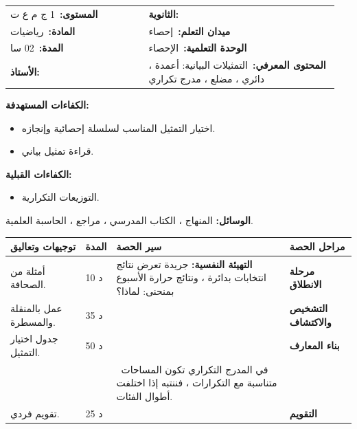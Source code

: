 \documentclass[12pt,a4paper]{article}
\makeatletter
\newenvironment{LTR}{\begin{otherlanguage}{english}}{\end{otherlanguage}}
\newcommand{\ar}[1]{\foreignlanguage{arabic}{#1}}
\newcommand{\Phase}[1]{\textbf{#1}}
\newcommand{\Fld}[2]{\textbf{#1:}\ #2}
\newcommand{\ModhHead}[9]{%
\begin{LTR}
\begin{tcolorbox}[enhanced,colback=white,colframe=cThm!85!black,arc=4mm,boxrule=1pt,top=14pt,bottom=6pt,left=8pt,right=8pt,
 overlay={\node[fill=cThm!85!black,text=white,rounded corners=3mm,inner xsep=14pt,inner ysep=4pt,font=\large\bfseries] at ([yshift=0pt]frame.north){\ar{مذكرة رقم #1}};},
 before upper={\selectlanguage{arabic}}]
\begin{tabular}{@{}p{0.4\linewidth}p{0.55\linewidth}@{}}
\Fld{المستوى}{#2} & \Fld{الثانوية}{\dotfill}\\[3pt]
\Fld{المادة}{رياضيات} & \Fld{ميدان التعلم}{#3}\\[3pt]
\Fld{المدة}{#5} & \Fld{الوحدة التعلمية}{#4}\\[3pt]
\Fld{الأستاذ}{\dotfill} & \Fld{المحتوى المعرفي}{#6}\\
\end{tabular}
\end{tcolorbox}
\begin{tcolorbox}[enhanced,colback=white,colframe=cThm!85!black,arc=3mm,boxrule=0.8pt,sidebyside,sidebyside align=top,lefthand ratio=0.5,
 segmentation style={dashed,cThm!60},before upper={\selectlanguage{arabic}},before lower={\selectlanguage{arabic}}]
\textbf{الكفاءات المستهدفة:}\par #8
\tcblower
\textbf{الكفاءات القبلية:}\par #7
\end{tcolorbox}
\end{LTR}
\par\smallskip\textbf{الوسائل:} #9\par\smallskip}
\newenvironment{Sayr}{%
\begin{LTR}\renewcommand{\arraystretch}{1.25}
\begin{longtable}{|p{0.17\textwidth}|>{\centering\arraybackslash}p{0.06\textwidth}|p{0.53\textwidth}|>{\centering\arraybackslash}p{0.12\textwidth}|}
\hline\rowcolor{cThm!12}\ar{\textbf{توجيهات وتعاليق}} & \ar{\textbf{المدة}} & \ar{\textbf{سير الحصة}} & \ar{\textbf{مراحل الحصة}}\\\hline\endhead
\hline\endfoot}{\end{longtable}\end{LTR}}
\newcommand{\Row}[4]{\ar{\small #4} & \ar{#3} & \ar{#2} & \cellcolor{cThm!8}\ar{\Phase{#1}}\\\hline}
\newcommand{\Lab}[2]{\foreignlanguage{english}{\tcbox[on line,colback=#1,colframe=#1,boxrule=0pt,arc=2pt,boxsep=1pt,left=5pt,right=5pt,top=1pt,bottom=1pt]{\ar{\textcolor{white}{\textbf{#2}}}}}}
\newcommand{\ck}{\ensuremath{{\color{cRem}\checkmark}}}
\makeatother
\begin{document}
\newpage
\ModhHead{49}{1 ج م ع ت}{إحصاء}{الإحصاء}{02 سا}{التمثيلات البيانية: أعمدة ، دائري ، مضلع ، مدرج تكراري}%
{\begin{itemize}\item التوزيعات التكرارية.\end{itemize}}%
{\begin{itemize}\item اختيار التمثيل المناسب لسلسلة إحصائية وإنجازه.\item قراءة تمثيل بياني.\end{itemize}}%
{المنهاج ، الكتاب المدرسي ، مراجع ، الحاسبة العلمية.}
\begin{Sayr}
\Row{مرحلة الانطلاق}{%
\textbf{التهيئة النفسية:} جريدة تعرض نتائج انتخابات بدائرة ، ونتائج حرارة الأسبوع بمنحنى: لماذا؟}{10 د}{أمثلة من الصحافة.}
\Row{التشخيص والاكتشاف}{%
\Lab{cEx}{مناقشة النشاطين 02 و 03 صفحة 139}\par\ck\ مدد المكالمات ميزة مستمرة: نجمعها في فئات ونمثلها بـ \textbf{مدرج تكراري}.\par
\ck\ المخطط الدائري: زاوية كل قطاع متناسبة مع التواتر: $\alpha_i=f_i\times360^\circ$.\par
}{35 د}{عمل بالمنقلة والمسطرة.}
\Row{بناء المعارف}{%
\Lab{cThm}{اختيار التمثيل}\par\ck\ ميزة نوعية: مخطط بالأعمدة أو دائري.\par
\ck\ ميزة كمية متقطعة: مخطط بالأعمدة ، أو مضلع التكرارات (نصل رؤوس الأعمدة).\par
\ck\ ميزة مستمرة: مدرج تكراري (مستطيلات متلاصقة) ، ومضلع التكرارات بوصل منتصفات أعلى المستطيلات.\par
\Lab{cEx}{مدرج تكراري لمدد مكالمات (بالثواني)}\par\smallskip\begin{LTR}\centering\begin{tikzpicture}[x=0.06cm,y=0.12cm,font=\scriptsize]
\draw[->] (0,0)--(88,0) node[right]{$t$}; \draw[->] (0,0)--(0,18) node[above]{$n_i$};
\foreach \a/\h in {0/5,20/10,40/15,60/10} \draw[fill=cDef!25,draw=cDef] (\a,0) rectangle (\a+20,\h);
\foreach \a in {0,20,40,60,80} \node[below] at (\a,0){$\a$};
\foreach \h in {5,10,15} \node[left] at (0,\h){$\h$};
\end{tikzpicture}\end{LTR}\par}{50 د}{جدول اختيار التمثيل.}
\Row{}{%
\Lab{cThm!80!black}{حذار}\ في المدرج التكراري تكون المساحات متناسبة مع التكرارات ، فننتبه إذا اختلفت أطوال الفئات.}{}{}
\Row{التقويم}{%
\Lab{cEx}{تطبيق}\par في مؤسسة $360$ عاملاً ، $90$ منهم أعمارهم أقل من $30$ سنة. ما زاوية قطاعهم في المخطط الدائري؟\par\textbf{الحل:} $\dfrac{90}{360}\times360^\circ=90^\circ$.\par\textbf{واجب منزلي:} تمارين من الكتاب المدرسي.\par\smallskip\textbf{ملاحظات حول سير الحصة:} \dotfill}{25 د}{تقويم فردي.}
\end{Sayr}
\end{document}
